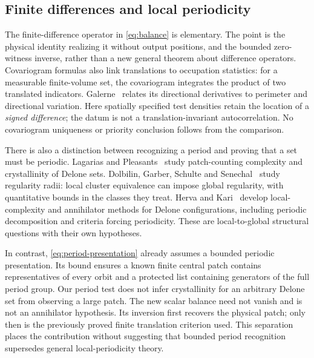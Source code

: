 \subsection{Finite differences and local periodicity}
The finite-difference operator in \eqref{eq:balance} is elementary.
The point is the physical identity realizing it without output positions,
and the bounded zero-witness inverse, rather than a new general theorem
about difference operators. Covariogram formulas also link translations
to occupation statistics: for a measurable finite-volume set, the
covariogram integrates the product of two translated indicators.
Galerne~\cite{Galerne} relates its directional derivatives to perimeter
and directional variation. Here spatially specified test densities
retain the location of a \emph{signed difference}; the datum is not a
translation-invariant autocorrelation. No covariogram uniqueness or
priority conclusion follows from the comparison.

There is also a distinction between recognizing a period and proving
that a set must be periodic. Lagarias and Pleasants~\cite{LP} study
patch-counting complexity and crystallinity of Delone sets. Dolbilin,
Garber, Schulte and Senechal~\cite{DGSS} study regularity radii: local
cluster equivalence can impose global regularity, with quantitative
bounds in the classes they treat. Herva and Kari~\cite{HK} develop
local-complexity and annihilator methods for Delone configurations,
including periodic decomposition and criteria forcing periodicity.
These are local-to-global structural questions with their own hypotheses.

In contrast, \eqref{eq:period-presentation} already assumes a bounded
periodic presentation. Its bound ensures a known finite central patch
contains representatives of every orbit and a protected list containing
generators of the full period group. Our period test does not infer
crystallinity for an arbitrary Delone set from observing a large patch.
The new scalar balance need not vanish and is not an annihilator
hypothesis. Its inversion first recovers the physical patch; only then
is the previously proved finite translation criterion used. This
separation places the contribution without suggesting that bounded
period recognition supersedes general local-periodicity theory.

